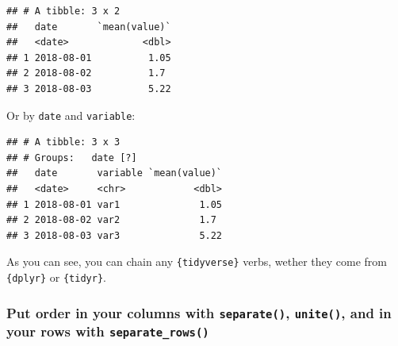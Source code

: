 \documentclass[]{gitbook}
\newenvironment{Shaded}{\begin{snugshade}}{\end{snugshade}}
\newcommand{\DataTypeTok}[1]{\textcolor[rgb]{0.13,0.29,0.53}{#1}}
\newcommand{\DecValTok}[1]{\textcolor[rgb]{0.00,0.00,0.81}{#1}}
\newcommand{\KeywordTok}[1]{\textcolor[rgb]{0.13,0.29,0.53}{\textbf{#1}}}
\newcommand{\NormalTok}[1]{#1}
\newcommand{\OperatorTok}[1]{\textcolor[rgb]{0.81,0.36,0.00}{\textbf{#1}}}
\newcommand{\StringTok}[1]{\textcolor[rgb]{0.31,0.60,0.02}{#1}}
\theoremstyle{definition}
\theoremstyle{definition}
\theoremstyle{definition}
\theoremstyle{remark}
\begin{document}
\begin{verbatim}
## # A tibble: 3 x 2
##   date       `mean(value)`
##   <date>             <dbl>
## 1 2018-08-01          1.05
## 2 2018-08-02          1.7 
## 3 2018-08-03          5.22
\end{verbatim}

Or by \texttt{date} and \texttt{variable}:

\begin{Shaded}
\end{Shaded}

\begin{verbatim}
## # A tibble: 3 x 3
## # Groups:   date [?]
##   date       variable `mean(value)`
##   <date>     <chr>            <dbl>
## 1 2018-08-01 var1              1.05
## 2 2018-08-02 var2              1.7 
## 3 2018-08-03 var3              5.22
\end{verbatim}

As you can see, you can chain any \texttt{\{tidyverse\}} verbs, wether
they come from \texttt{\{dplyr\}} or \texttt{\{tidyr\}}.

\hypertarget{put-order-in-your-columns-with-separate-unite-and-in-your-rows-with-separate_rows}{%
\subsubsection{\texorpdfstring{Put order in your columns with
\texttt{separate()}, \texttt{unite()}, and in your rows with
\texttt{separate\_rows()}}{Put order in your columns with separate(), unite(), and in your rows with separate\_rows()}}\label{put-order-in-your-columns-with-separate-unite-and-in-your-rows-with-separate_rows}}
\end{document}
